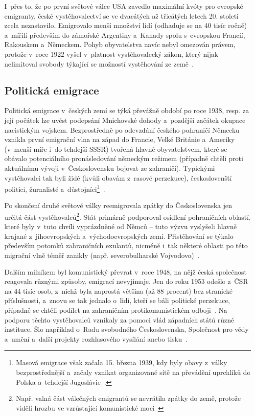 I~přes to, že po první světové válce USA zavedlo maximální kvóty pro evropské emigranty, české vystěhovalectví se ve dvacátých až třicátých letech 20. století zcela nezastavilo. Emigrovalo menší množství lidí (odhaduje se na 40 tisíc ročně) a~mířili především do zámořské Argentiny a~Kanady spolu s~evropskou Francií, Rakouskem a~Německem. Pohyb obyvatelstva navíc nebyl omezován právem, protože v~roce 1922 vyšel v~platnost vystěhovalecký zákon, který nijak nelimitoval svobody týkající se možností vystěhování ze země~\parencite{Vaculik2009b}.

\hypertarget{politickuxe1-emigrace}{%
\subsection{Politická emigrace}\label{politickuxe1-emigrace}}

Politická emigrace v~českých zemí se týká převážně období po roce 1938, resp. za její počátek lze uvést podepsání Mnichovské dohody a~pozdější začátek okupace nacistickým vojskem. Bezprostředně po odevzdání českého pohraničí Německu vznikla první emigrační vlna na západ do Francie, Velké Británie a~Ameriky (v~menší míře i~do tehdejší SSSR) tvořená hlavně obyvatelstvem, které se obávalo potenciálního pronásledování německým režimem (případně chtěli proti aktuálnímu vývoji v~Československu bojovat ze zahraničí). Typickými vystěhovalci tak byli židé (kvůli obavám z~rasové perzekuce), českoslovenští politici, žurnalisté a~důstojníci\footnote{Masová emigrace však začala 15. března 1939, kdy byly obavy z~války bezprostřednější a~začaly vznikat organizované sítě na převádění uprchlíků do Polska a~tehdejší Jugoslávie~\parencite{Vaculik2002}.}~\parencite{Nespor2005}.

Po skončení druhé světové války reemigrovala zpátky do Československa jen určitá část vystěhovalců\footnote{Např. valná část válečných emigrantů se nevrátila zpátky do země, protože viděli hrozbu ve vzrůstající komunistické moci~\parencite{Vaculik2009a}}. Stát primárně podporoval osídlení pohraničních oblastí, které byly v~tuto chvíli vyprázdněné od Němců -- tuto výzvu vyslyšeli hlavně krajané z~jihoevropských a~východoevropských zemí. Přistěhování se týkalo především potomků zahraničních exulantů, nicméně i~tak některé oblasti po této migrační vlně téměř zanikly (např. severobulharské Vojvodovo)~\parencite{Nespor2005}.

Dalším milníkem byl komunistický převrat v~roce 1948, na nějž česká společnost reagovala různými způsoby, emigrací nevyjímaje. Jen do roku 1953 odešlo z~ČSR na 44 tisíc osob, z~nichž byla naprostá většina (až 88 procent) bez stranické příslušnosti, a~znovu se tak jednalo o~lidí, kteří se báli politické perzekuce, případně se chtěli podílet na zahraničním protikomunistickém odboji~\parencite{Vaculik2002}. Na podporu těchto vystěhovalců vznikaly za pomoci vlád západních států různé instituce. Šlo například o~Radu svobodného Československa, Společnost pro vědy a~umění a~další projekty rozhlasového vysílání anebo tisku~\parencite{Nespor2005}.

